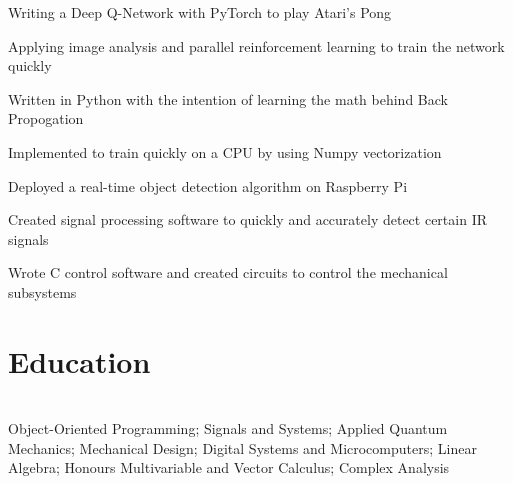\documentclass[]{deedy-resume-openfont}
\begin{document}
\begin{tightemize}
	\item Writing a Deep Q-Network with PyTorch to play Atari's Pong
	\item Applying image analysis and parallel reinforcement learning to train the network quickly
\end{tightemize}

\vspace{8pt}

\begin{tightemize}
	\item Written in Python with the intention of learning the math behind Back Propogation 
	\item Implemented to train quickly on a CPU by using Numpy vectorization
\end{tightemize}

\vspace{8pt}

\begin{tightemize}
	\item Deployed a real-time object detection algorithm on Raspberry Pi
	\item Created signal processing software to quickly and accurately detect certain IR signals
	\item Wrote C control software and created circuits to control the mechanical subsystems
\end{tightemize}

\vspace{12pt}


\section{Education}

\begin{adjustwidth}{0.55cm}{1.25cm}
	 \\
	 Object-Oriented Programming; Signals and Systems; Applied Quantum Mechanics; Mechanical Design; Digital Systems and Microcomputers; Linear Algebra; Honours Multivariable and Vector Calculus; Complex Analysis
\end{adjustwidth}
\vspace{8pt}
\end{document}
